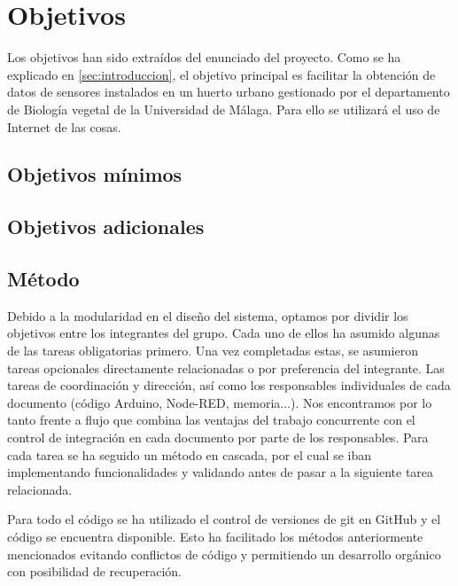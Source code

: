 \section{Objetivos}\label{sec:objetivos}
Los objetivos han sido extraídos del enunciado del proyecto. Como se ha explicado en \ref{sec:introduccion}, el objetivo principal es facilitar la obtención de datos de sensores instalados en un huerto urbano gestionado por el departamento de Biología vegetal de la Universidad de Málaga. Para ello se utilizará el uso de Internet de las cosas.

\subsection{Objetivos mínimos}

\subsection{Objetivos adicionales}

\subsection{Método}

Debido a la modularidad en el diseño del sistema, optamos por dividir los objetivos entre los integrantes del grupo. Cada uno de ellos ha asumido algunas de las tareas obligatorias primero. Una vez completadas estas, se asumieron tareas opcionales directamente relacionadas o por preferencia del integrante. Las tareas de coordinación y dirección, así como los responsables individuales de cada documento (código Arduino, Node-RED, memoria...). Nos encontramos por lo tanto frente a flujo que combina las ventajas del trabajo concurrente con el control de integración en cada documento por parte de los responsables. Para cada tarea se ha seguido un método en cascada, por el cual se iban implementando funcionalidades y validando antes de pasar a la siguiente tarea relacionada.

Para todo el código se ha utilizado el control de versiones de git en GitHub y el código se encuentra disponible. Esto ha facilitado los métodos anteriormente mencionados evitando conflictos de código y permitiendo un desarrollo orgánico con posibilidad de recuperación.


